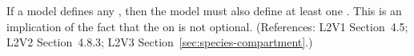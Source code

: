 If a model defines any \Species, then the model must also define at least
one \Compartment.  This is an implication of the fact that the
  on \Species is not optional.  (References: L2V1
Section~4.5; L2V2 Section~4.8.3; L2V3 Section~\ref{sec:species-compartment}.)
